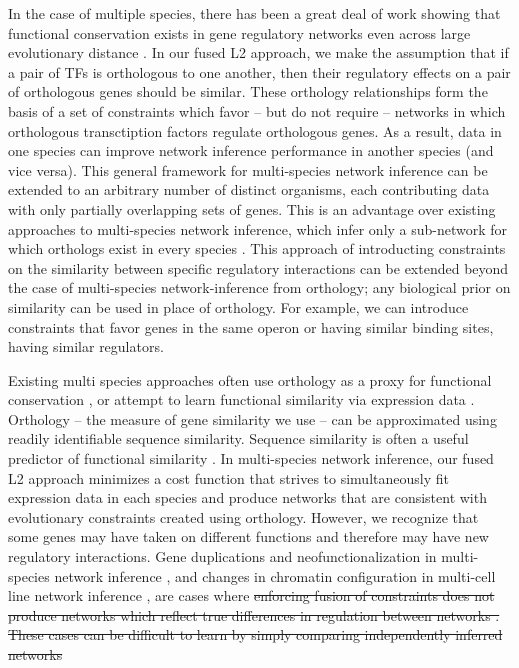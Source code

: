 \documentclass[11pt]{article}
\providecommand{\DIFadd}[1]{{\protect\color{blue}\uwave{#1}}} %
\providecommand{\DIFdel}[1]{{\protect\color{red}\sout{#1}}}                      %
\providecommand{\DIFaddbegin}{} %
\providecommand{\DIFdelbegin}{} %
\providecommand{\DIFdelend}{} %
\begin{document}
In the case of multiple species, there has been a great deal of work showing that functional conservation exists in gene regulatory networks even across large evolutionary distance \cite{satou2006gene, hinman2009evolution,tanay2005conservation,erwin2009evolution}. In our fused L2 approach, we make the assumption that if a pair of TFs is orthologous to one another, then their regulatory effects on a pair of orthologous genes should be similar. These orthology relationships form the basis of a set of constraints which favor -- but do not require -- networks in which orthologous transctiption factors regulate orthologous genes. As a result, data in one species can improve network inference performance in another species  (and vice versa). This general framework for multi-species network inference can be extended to an arbitrary number of distinct organisms, each contributing data with only partially overlapping sets of genes. This is an advantage over existing approaches to multi-species network inference, which infer only a sub-network for which orthologs exist in every species \cite{joshi_multi-species_2015}. This approach of introducting constraints on the similarity between specific regulatory interactions can be extended beyond the case of multi-species network-inference from orthology; any biological prior on similarity can be used in place of orthology. For example, we can introduce constraints that favor genes in the same operon or having similar binding sites, having similar regulators.

Existing multi species approaches often use orthology as a proxy for functional conservation \cite{penfold_inferring_2015, joshi_multi-species_2015, kashima_simultaneous_2009, zhang2010nearly}, or attempt to learn functional similarity via expression data \cite{gholami_cross-species_2010}. Orthology -- the measure of gene similarity we use -- can be approximated using readily identifiable sequence similarity. Sequence similarity is often a useful predictor of functional similarity \cite{wilson_assessing_2000}. In multi-species network inference, our fused L2 approach minimizes a cost function that strives to simultaneously fit expression data in each species and produce networks that are consistent with evolutionary constraints created using orthology. However, we recognize that some genes may have taken on different functions and therefore may have new regulatory interactions. Gene duplications and neofunctionalization in multi-species network inference \cite{eisen_phylogenomics:_1998}, and changes in chromatin configuration in multi-cell line network inference \cite{li_role_2007}, are cases where \DIFdelbegin \DIFdel{enforcing fusion of constraints does not produce networks which reflect true differences in regulation between networks . These cases can be difficult to learn by simply comparing independently inferred networks}\DIFdelend \DIFaddbegin \DIFadd{assumptions about functional conservation may not hold. 
}
\end{document}
